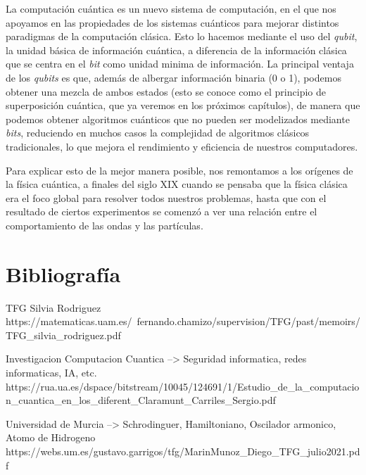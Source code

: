 \documentclass{article}
\begin{document}
    \vspace{0.5cm}

    La computación cuántica es un nuevo sistema de computación, en el que nos apoyamos en las propiedades de los sistemas cuánticos para mejorar distintos paradigmas de la computación clásica. Esto lo hacemos mediante el uso del \textit{qubit}, la unidad básica de información cuántica, a diferencia de la información clásica que se centra en el \textit{bit} como unidad minima de información. La principal ventaja de los \textit{qubits} es que, además de albergar información binaria (0 o 1), podemos obtener una mezcla de ambos estados (esto se conoce como el principio de superposición cuántica, que ya veremos en los próximos capítulos), de manera que podemos obtener algoritmos cuánticos que no pueden ser modelizados mediante \textit{bits}, reduciendo en muchos casos la complejidad de algoritmos clásicos tradicionales, lo que mejora el rendimiento y eficiencia de nuestros computadores.

    \vspace{0.5cm}

    Para explicar esto de la mejor manera posible, nos remontamos a los orígenes de la física cuántica, a finales del siglo XIX cuando se pensaba que la física clásica era el foco global para resolver todos nuestros problemas, hasta que con el resultado de ciertos experimentos se comenzó a ver una relación entre el comportamiento de las ondas y las partículas.

    \vspace{0.5cm}





    \newpage
    \thispagestyle{empty}
    \mbox{}
    \newpage

    \section{Bibliografía}

    TFG Silvia Rodriguez
    https://matematicas.uam.es/~fernando.chamizo/supervision/TFG/past/memoirs/TFG_silvia_rodriguez.pdf

    Investigacion Computacion Cuantica --> Seguridad informatica, redes informaticas, IA, etc.
    https://rua.ua.es/dspace/bitstream/10045/124691/1/Estudio_de_la_computacion_cuantica_en_los_diferent_Claramunt_Carriles_Sergio.pdf

    Universidad de Murcia --> Schrodinguer, Hamiltoniano, Oscilador armonico, Atomo de Hidrogeno
    https://webs.um.es/gustavo.garrigos/tfg/MarinMunoz_Diego_TFG_julio2021.pdf
\end{document}
